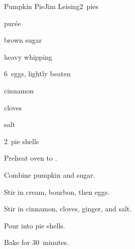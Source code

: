 \begin{recipe}{Pumpkin Pie}{Jim Leising}{2~pies}

\begin{ingredients}
\item \C{1\threequarter}  purée
\item {} brown sugar
\item \C{1\half} heavy whipping 
\item \C{\half} 
\item 6~eggs, lightly beaten
\item {} cinnamon
\item \tp{\half} cloves
\item \tp{1\half} 
\item \tp{\quarter} salt
\item 2~pie shells
\end{ingredients}

\begin{directions}
\item Preheat oven to .
\item Combine pumpkin and sugar.
\item Stir in cream, bourbon, then eggs.
\item Stir in cinnamon, cloves, ginger, and salt.
\item Pour into pie shells.
\item Bake for 30~minutes.
\end{directions}

\end{recipe}
